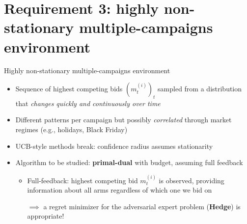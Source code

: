 ﻿\section{Requirement 3: highly non-stationary multiple-campaigns environment}

\begin{frame}{Highly non-stationary multiple-campaigns environment}
    \begin{itemize}
        \item Sequence of highest competing bids $(m_t^{(i)})_t$ sampled from a distribution that \emph{changes quickly and continuously over time}
        \item Different patterns per campaign but possibly \emph{correlated} through market regimes (e.g., holidays, Black Friday)
        \item UCB-style methods break: confidence radius assumes stationarity
        \item Algorithm to be studied: \textbf{primal-dual} with budget, assuming full feedback
        \begin{itemize}
            \item Full-feedback: highest competing bid $m_t^{(i)}$ is observed, providing information about all arms regardless of which one we bid on
            
            $\implies$ a regret minimizer for the adversarial expert problem (\textbf{Hedge}) is appropriate!
        \end{itemize}
    \end{itemize}
\end{frame}

